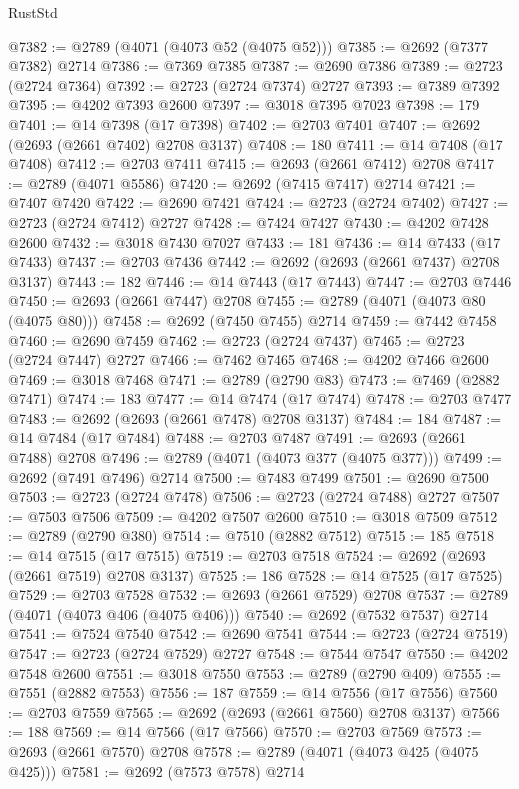 \begin{lexlean}{RustStd}
\begin{coremodule}
@7382 := @2789 (@4071 (@4073 @52 (@4075 @52)))
@7385 := @2692 (@7377 @7382) @2714
@7386 := @7369 @7385
@7387 := @2690 @7386
@7389 := @2723 (@2724 @7364)
@7392 := @2723 (@2724 @7374) @2727
@7393 := @7389 @7392
@7395 := @4202 @7393 @2600
@7397 := @3018 @7395 @7023
@7398 := 179
@7401 := @14 @7398 (@17 @7398)
@7402 := @2703 @7401
@7407 := @2692 (@2693 (@2661 @7402) @2708 @3137)
@7408 := 180
@7411 := @14 @7408 (@17 @7408)
@7412 := @2703 @7411
@7415 := @2693 (@2661 @7412) @2708
@7417 := @2789 (@4071 @5586)
@7420 := @2692 (@7415 @7417) @2714
@7421 := @7407 @7420
@7422 := @2690 @7421
@7424 := @2723 (@2724 @7402)
@7427 := @2723 (@2724 @7412) @2727
@7428 := @7424 @7427
@7430 := @4202 @7428 @2600
@7432 := @3018 @7430 @7027
@7433 := 181
@7436 := @14 @7433 (@17 @7433)
@7437 := @2703 @7436
@7442 := @2692 (@2693 (@2661 @7437) @2708 @3137)
@7443 := 182
@7446 := @14 @7443 (@17 @7443)
@7447 := @2703 @7446
@7450 := @2693 (@2661 @7447) @2708
@7455 := @2789 (@4071 (@4073 @80 (@4075 @80)))
@7458 := @2692 (@7450 @7455) @2714
@7459 := @7442 @7458
@7460 := @2690 @7459
@7462 := @2723 (@2724 @7437)
@7465 := @2723 (@2724 @7447) @2727
@7466 := @7462 @7465
@7468 := @4202 @7466 @2600
@7469 := @3018 @7468
@7471 := @2789 (@2790 @83)
@7473 := @7469 (@2882 @7471)
@7474 := 183
@7477 := @14 @7474 (@17 @7474)
@7478 := @2703 @7477
@7483 := @2692 (@2693 (@2661 @7478) @2708 @3137)
@7484 := 184
@7487 := @14 @7484 (@17 @7484)
@7488 := @2703 @7487
@7491 := @2693 (@2661 @7488) @2708
@7496 := @2789 (@4071 (@4073 @377 (@4075 @377)))
@7499 := @2692 (@7491 @7496) @2714
@7500 := @7483 @7499
@7501 := @2690 @7500
@7503 := @2723 (@2724 @7478)
@7506 := @2723 (@2724 @7488) @2727
@7507 := @7503 @7506
@7509 := @4202 @7507 @2600
@7510 := @3018 @7509
@7512 := @2789 (@2790 @380)
@7514 := @7510 (@2882 @7512)
@7515 := 185
@7518 := @14 @7515 (@17 @7515)
@7519 := @2703 @7518
@7524 := @2692 (@2693 (@2661 @7519) @2708 @3137)
@7525 := 186
@7528 := @14 @7525 (@17 @7525)
@7529 := @2703 @7528
@7532 := @2693 (@2661 @7529) @2708
@7537 := @2789 (@4071 (@4073 @406 (@4075 @406)))
@7540 := @2692 (@7532 @7537) @2714
@7541 := @7524 @7540
@7542 := @2690 @7541
@7544 := @2723 (@2724 @7519)
@7547 := @2723 (@2724 @7529) @2727
@7548 := @7544 @7547
@7550 := @4202 @7548 @2600
@7551 := @3018 @7550
@7553 := @2789 (@2790 @409)
@7555 := @7551 (@2882 @7553)
@7556 := 187
@7559 := @14 @7556 (@17 @7556)
@7560 := @2703 @7559
@7565 := @2692 (@2693 (@2661 @7560) @2708 @3137)
@7566 := 188
@7569 := @14 @7566 (@17 @7566)
@7570 := @2703 @7569
@7573 := @2693 (@2661 @7570) @2708
@7578 := @2789 (@4071 (@4073 @425 (@4075 @425)))
@7581 := @2692 (@7573 @7578) @2714

\end{coremodule}
\end{lexlean}

